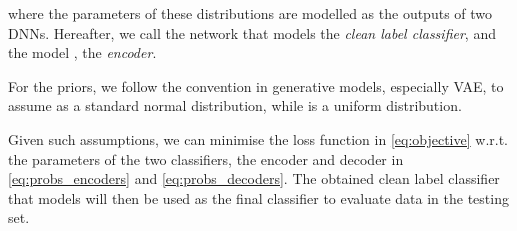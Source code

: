 \documentclass[10pt,twocolumn,letterpaper]{article}
\begin{document}
        where the parameters of these distributions are modelled as the outputs of two DNNs. Hereafter, we call the network that models  the \emph{clean label classifier}, and the  model , the \emph{encoder}. 
        
        For the priors, we follow the convention in generative models, especially VAE, to assume  as a standard normal distribution, while  is a uniform distribution.
        
        Given such assumptions, we can minimise the loss function  in \eqref{eq:objective} w.r.t. the parameters of the two classifiers, the encoder and decoder in \eqref{eq:probs_encoders} and \eqref{eq:probs_decoders}. The obtained clean label classifier that models  will then be used as the final classifier to evaluate data in the testing set.
        
\end{document}
